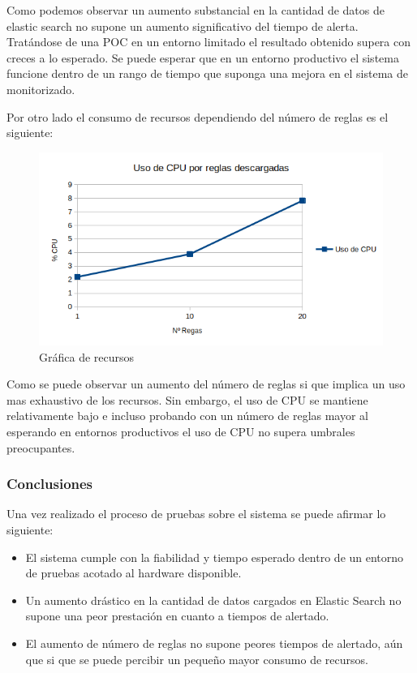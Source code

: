 Como podemos observar un aumento substancial en la cantidad de datos de elastic search no supone un aumento significativo del tiempo de alerta. Tratándose de una POC en un entorno limitado el resultado obtenido supera con creces a lo esperado. Se puede esperar que en un entorno productivo el sistema funcione dentro de un rango de tiempo que suponga una mejora en el sistema de monitorizado. 

Por otro lado el consumo de recursos dependiendo del número de reglas es el siguiente:

\begin{figure}[H]
\centerline{\includegraphics[width=15cm]{figuras/GraficaRecursos.png}}
\caption{Gráfica de recursos}
\label{enlace1}
\end{figure}

Como se puede observar un aumento del número de reglas si que implica un uso mas exhaustivo de los recursos. Sin embargo, el uso de CPU se mantiene relativamente bajo e incluso probando con un número de reglas mayor al esperando en entornos productivos el uso de CPU no supera umbrales preocupantes.


\subsubsection{Conclusiones}

Una vez realizado el proceso de pruebas sobre el sistema se puede afirmar lo siguiente:

\begin{itemize}

\item El sistema cumple con la fiabilidad y tiempo esperado dentro de un entorno de pruebas acotado al hardware disponible.

\item Un aumento drástico en la cantidad de datos cargados en Elastic Search no supone una peor prestación en cuanto a tiempos de alertado.

\item El aumento de número de reglas no supone peores tiempos de alertado, aún que si que se puede percibir un pequeño mayor consumo de recursos. 

\end{itemize}

